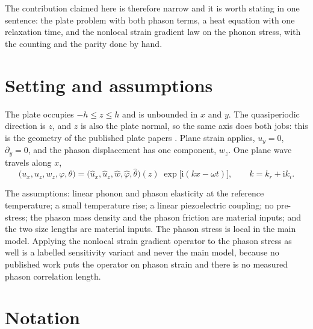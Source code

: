 \documentclass[11pt]{article}
\newcommand{\ii}{\mathrm{i}}
\begin{document}
The contribution claimed here is therefore narrow and it is worth stating in one sentence: the plate
problem with both phason terms, a heat equation with one relaxation time, and the nonlocal strain gradient
law on the phonon stress, with the counting and the parity done by hand.

\section{Setting and assumptions}\label{sec:setting}

The plate occupies $-h\le z\le h$ and is unbounded in $x$ and $y$. The quasiperiodic direction is $z$, and
$z$ is also the plate normal, so the same axis does both jobs: this is the geometry of the published plate
papers \cite{Zhang2021}. Plane strain applies, $u_y=0$, $\partial_y=0$, and the phason displacement has one
component, $w_z$. One plane wave travels along $x$,
\begin{equation}
\bigl(u_x,u_z,w_z,\varphi,\theta\bigr)
=\bigl(\hat u_x,\hat u_z,\hat w,\hat\varphi,\hat\theta\bigr)(z)\;
\exp\bigl[\ii(kx-\omega t)\bigr],
\qquad k=k_r+\ii k_i .
\label{eq:ansatz}
\end{equation}

The assumptions: linear phonon and phason elasticity at the reference temperature; a small temperature
rise; a linear piezoelectric coupling; no pre-stress; the phason mass density and the phason friction are
material inputs; and the two size lengths are material inputs. The phason stress is local in the main
model. Applying the nonlocal strain gradient operator to the phason stress as well is a labelled
sensitivity variant and never the main model, because no published work puts the operator on phason strain
and there is no measured phason correlation length.

\section{Notation}\label{sec:notation}
\end{document}
